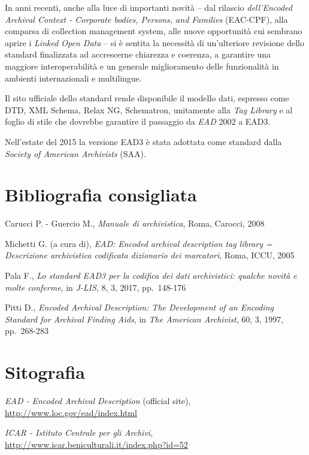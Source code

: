 \documentclass[
  b5paper,
  twoside,
  12pt,
  chapterprefix=false,
  bibliography=totocnumbered,
  parskip=false]{scrbook}
\begin{document}
In anni recenti, anche alla luce di importanti novità -- dal rilascio
\emph{dell'Encoded Archival Context - Corporate bodies, Persons, and
Families} (EAC-CPF), alla comparsa di collection management system, alle
nuove opportunità cui sembrano aprire i \emph{Linked Open Data} -- si è
sentita la necessità di un'ulteriore revisione dello standard
finalizzata ad accrescerne chiarezza e coerenza, a garantire una
maggiore interoperabilità e un generale miglioramento delle funzionalità
in ambienti internazionali e multilingue.

Il sito ufficiale dello standard rende disponibile il modello dati,
espresso come DTD, XML Schema, Relax NG, Schematron, unitamente alla
\emph{Tag Library} e al foglio di stile che dovrebbe garantire il passaggio
da \emph{EAD} 2002 a EAD3.

Nell'estate del 2015 la versione EAD3 è stata adottata come standard
dalla \emph{Society of American Archivists} (SAA).

\hypertarget{bibliografia-consigliata-9}{%
\section*{Bibliografia consigliata}\label{bibliografia-consigliata-9}}

Carucci P. - Guercio M., \emph{Manuale di archivistica}, Roma, Carocci, 2008

Michetti G. (a cura di), \emph{EAD: Encoded archival description tag library
= Descrizione archivistica codificata dizionario dei marcatori}, Roma,
ICCU, 2005

Pala F., \emph{Lo standard EAD3 per la codifica dei dati archivistici:
qualche novità e molte conferme}, in \emph{J-LIS}, 8, 3, 2017, pp.~148-176

Pitti D., \emph{Encoded Archival Description: The Development of an Encoding
Standard for Archival Finding Aids}, in \emph{The American Archivist}, 60, 3,
1997, pp.~268-283

\hypertarget{sitografia-10}{%
\section*{Sitografia}\label{sitografia-10}}

\emph{EAD - Encoded Archival Description} (official site),
\url{http://www.loc.gov/ead/index.html}

\emph{ICAR - Istituto Centrale per gli Archivi},
\url{http://www.icar.beniculturali.it/index.php?id=52}
\end{document}
